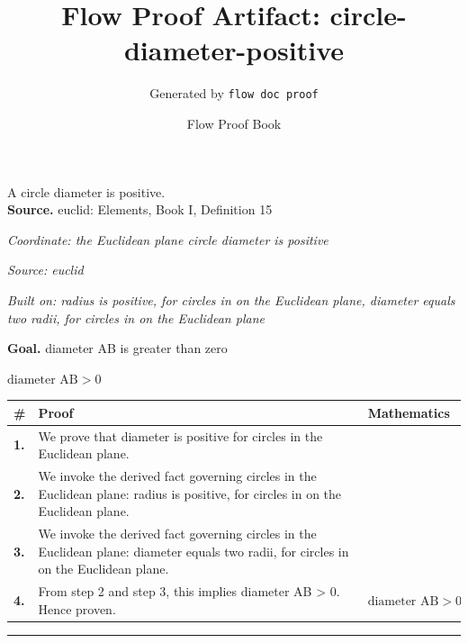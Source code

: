 \documentclass[11pt]{article}
\title{Flow Proof Artifact: circle-diameter-positive}
\author{Generated by \texttt{flow doc proof}}
\date{Flow Proof Book}
\theoremstyle{definition}
\begin{document}
\maketitle
A circle diameter is positive.\\[0.5em]
\textbf{Source.} euclid: Elements, Book I, Definition 15\\[0.5em]
\bigskip
{}\par
\smallskip\noindent\textit{Coordinate: the Euclidean plane \cdot circle \cdot diameter is positive}\par
\smallskip\noindent\textit{Source: euclid}\par
\smallskip\noindent\textit{Built on: radius is positive, for circles in on the Euclidean plane, diameter equals two radii, for circles in on the Euclidean plane}\par
\medskip
\noindent\textbf{Goal.} diameter AB is greater than zero\par
\noindent$\displaystyle \text{diameter AB} > 0$\par
\medskip
\noindent
\begin{tabular}{@{} >{\raggedright\arraybackslash}p{} >{\raggedright\arraybackslash}p{} >{\raggedleft\arraybackslash}p{} @{}}
\textbf{\#} & \textbf{Proof} & \textbf{Mathematics} \\
\midrule
\textbf{1.} & We prove that diameter is positive for circles in the Euclidean plane. & \\[0.45em]
\textbf{2.} & We invoke the derived fact governing circles in the Euclidean plane: radius is positive, for circles in on the Euclidean plane. & \\[0.45em]
\textbf{3.} & We invoke the derived fact governing circles in the Euclidean plane: diameter equals two radii, for circles in on the Euclidean plane. & \\[0.45em]
\textbf{4.} & From step 2 and step 3, this implies diameter AB > 0. Hence proven. & $\displaystyle \text{diameter AB} > 0$ \\[0.45em]
\bottomrule
\end{tabular}
\label{thm:Geometry-circle-diameter_is_positive}
\par\medskip\hrule
\end{document}
